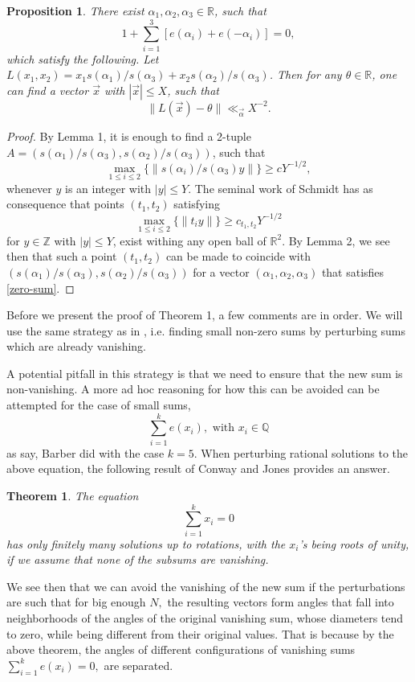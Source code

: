 \documentclass[10pt,a4paper]{amsart}
\newtheorem{proposition}{Proposition}
\newtheorem*{utheorem}{Theorem}
\newcommand{\Q}{\mathbb{Q}}
\newcommand{\Z}{\mathbb{Z}}
\begin{document}
\begin{proposition}
    There exist $\alpha_1,\alpha_2,\alpha_3\in \mathbb{R}$, such that 
    \begin{equation}\label{zero-sum}
        1+\sum_{i=1}^3 \left[e(\alpha_i)+e(-\alpha_i)\right]=0,
    \end{equation}
    which satisfy the following. Let $L(x_1,x_2)=x_1s(\alpha_1)/s(\alpha_3)+x_2s(\alpha_2)/s(\alpha_3)$. Then for any $\theta\in \mathbb{R}$, one can find a vector $\vec{x}$ with $|\vec{x}|\leq X$, such that
    \begin{equation}
        \|L(\vec{x})-\theta \|\ll_{\vec{\alpha}} X^{-2}.
    \end{equation}
\end{proposition}
\begin{proof}
     By Lemma 1, it is enough to find a 2-tuple $A=(s(\alpha_1)/s(\alpha_3),s(\alpha_2)/s(\alpha_3))$, such that
    \begin{equation}\label{sufficient}
        \max_{1\leq i\leq 2}\{\| s(\alpha_i)/s(\alpha_3)y \|\}\geq c Y^{-1/2},
    \end{equation}
    whenever $y$ is an integer with $|y|\leq Y$. The seminal work of Schmidt \cite{schmidt} has as consequence that points $(t_1,t_2)$ satisfying
    $$ \max_{1\leq i\leq  2}\{\| t_iy\|\}\geq c_{t_1,t_2} Y^{-1/2}  $$
    for $y\in \Z$ with $|y|\leq Y$, exist withing any open ball of $\mathbb{R}^2$. By Lemma 2, we see then that such a point $(t_1,t_2)$ can be made to coincide with $(s(\alpha_1)/s(\alpha_3),s(\alpha_2)/s(\alpha_3))$ for a vector $(\alpha_1,\alpha_2,\alpha_3)$ that satisfies \eqref{zero-sum}.
\end{proof}
Before we present the proof of Theorem 1, a few comments are in order. We will use the same strategy as in \cite{benb}, i.e. finding small non-zero sums by perturbing sums which are already vanishing. 

A potential pitfall in this strategy is that we need to ensure that the new sum is non-vanishing. A more ad hoc reasoning for how this can be avoided can be attempted for the case of small sums,
$$\sum_{i=1}^k e(x_i), \text{  with  } x_i\in\Q  $$
as say, Barber did with the case $k=5$. When perturbing rational solutions to the above equation, the following result of Conway and Jones provides an answer.
\begin{utheorem}
    The equation
    $$  \sum_{i=1}^k x_i=0 $$
    has only finitely many solutions up to rotations, with the $x_i$'s being roots of unity, if we assume that none of the subsums are vanishing.
\end{utheorem}
We see then that we can avoid the vanishing of the new sum if the perturbations are such that for big enough $N,$ the resulting vectors form angles that fall into neighborhoods of the angles of the original vanishing sum, whose diameters tend to zero, while being different from their original values. That is because by the above theorem, the angles of different configurations of vanishing sums $\sum_{i=1}^k e(x_i)=0,$ are separated.
\end{document}
